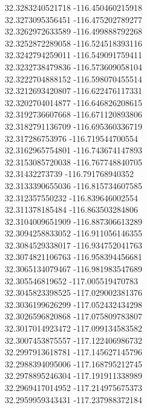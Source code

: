 {32.3283240521718	-116.450460215918\\
32.3273095356451	-116.475202789277\\
32.3262972633589	-116.499888792268\\
32.3252872289058	-116.524518393116\\
32.3242794259011	-116.549091759411\\
32.3232738479836	-116.573609058104\\
32.3222704888152	-116.598070455514\\
32.3212693420807	-116.622476117331\\
32.3202704014877	-116.646826208615\\
32.3192736607668	-116.671120893806\\
32.3182791136709	-116.695360336719\\
32.317286753976	-116.719544700554\\
32.3162965754801	-116.743674147893\\
32.3153085720038	-116.767748840705\\
32.31432273739	-116.791768940352\\
32.3133390655036	-116.815734607585\\
32.312357550232	-116.839646002554\\
32.311378185484	-116.863503284806\\
32.3104009651909	-116.887306613289\\
32.3094258833052	-116.911056146355\\
32.3084529338017	-116.934752041763\\
32.3074821106763	-116.958394456681\\
32.3065134079467	-116.981983547689\\
32.305546819652	-117.005519470783\\
32.3045823398525	-117.029002381376\\
32.3036199626299	-117.052432434298\\
32.3026596820868	-117.075809783807\\
32.3017014923472	-117.099134583582\\
32.3007453875557	-117.122406986732\\
32.2997913618781	-117.145627145796\\
32.2988394095006	-117.168795212745\\
32.2978895246304	-117.191911338989\\
32.2969417014952	-117.214975675373\\
32.2959959343431	-117.237988372184\\
}
